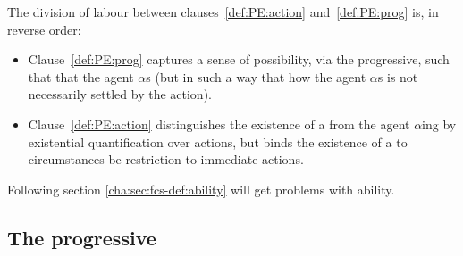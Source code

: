 \begin{note}
  The division of labour between clauses~\ref{def:PE:action} and~\ref{def:PE:prog} is, in reverse order:
  \begin{itemize}[noitemsep]
  \item
    Clause~\ref{def:PE:prog} captures a sense of possibility, via the progressive, such that that the agent \(\alpha\)s (but in such a way that how the agent \(\alpha\)s is not necessarily settled by the action).
\item
  Clause~\ref{def:PE:action} distinguishes the existence of a \pevent{} from the agent \(\alpha\)ing by existential quantification over actions, but binds the existence of a \pevent{} to circumstances be restriction to immediate actions.
  \end{itemize}
\end{note}

\begin{note}
  Following section \autoref{cha:sec:fcs-def:ability} will get problems with ability.
\end{note}

\subsection{The progressive}
\label{cha:fcs:sec:progressive}

